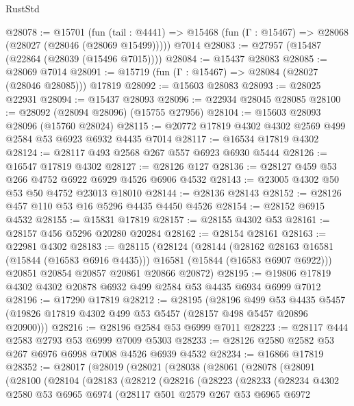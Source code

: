 \begin{lexlean}{RustStd}
\begin{coremodule}
@28078 := @15701
    (fun (tail : @4441) => @15468 (fun (Γ : @15467) => @28068 (@28027 (@28046 (@28069 @15499)))))
    @7014
@28083 := @27957 (@15487 (@22864 (@28039 (@15496 @7015))))
@28084 := @15437 @28083
@28085 := @28069 @7014
@28091 := @15719 (fun (Γ : @15467) => @28084 (@28027 (@28046 @28085))) @17819
@28092 := @15603 @28083
@28093 := @28025 @22931
@28094 := @15437 @28093
@28096 := @22934 @28045 @28085
@28100 := @28092 (@28094 @28096) (@15755 @27956)
@28104 := @15603 @28093 @28096 (@15760 @28024)
@28115 := @20772 @17819 @4302 @4302 @2569 @499 @2584 @53 @6923 @6932 @4435 @7014
@28117 := @16534 @17819 @4302
@28124 := @28117 @493 @2568 @267 @557 @6923 @6930 @5444
@28126 := @16547 @17819 @4302
@28127 := @28126 @127
@28136 := @28127 @459 @53 @266 @4752 @6922 @6929 @4526 @6906 @4532
@28143 := @23005 @4302 @50 @53 @50 @4752 @23013 @18010
@28144 := @28136 @28143
@28152 := @28126 @457 @110 @53 @16 @5296 @4435 @4450 @4526
@28154 := @28152 @6915 @4532
@28155 := @15831 @17819
@28157 := @28155 @4302 @53
@28161 := @28157 @456 @5296 @20280 @20284
@28162 := @28154 @28161
@28163 := @22981 @4302
@28183 := @28115
    (@28124
      (@28144
        (@28162 @28163 @16581 (@15844 (@16583 @6916 @4435)))
        @16581
        (@15844 (@16583 @6907 @6922)))
      @20851
      @20854
      @20857
      @20861
      @20866
      @20872)
@28195 := @19806 @17819 @4302 @4302 @20878 @6932 @499 @2584 @53 @4435 @6934 @6999 @7012
@28196 := @17290 @17819
@28212 := @28195
    (@28196
      @499
      @53
      @4435
      @5457
      (@19826 @17819 @4302 @499 @53 @5457 (@28157 @498 @5457 @20896 @20900)))
@28216 := @28196 @2584 @53 @6999 @7011
@28223 := @28117 @444 @2583 @2793 @53 @6999 @7009 @5303
@28233 := @28126 @2580 @2582 @53 @267 @6976 @6998 @7008 @4526 @6939 @4532
@28234 := @16866 @17819
@28352 := @28017
    (@28019
      (@28021
        (@28038
          (@28061
            (@28078
              (@28091
                (@28100
                  (@28104
                    (@28183
                      (@28212
                        (@28216
                          (@28223
                            (@28233
                              (@28234
                                @4302
                                @2580
                                @53
                                @6965
                                @6974
                                (@28117
                                  @501
                                  @2579
                                  @267
                                  @53
                                  @6965
                                  @6972

\end{coremodule}
\end{lexlean}

